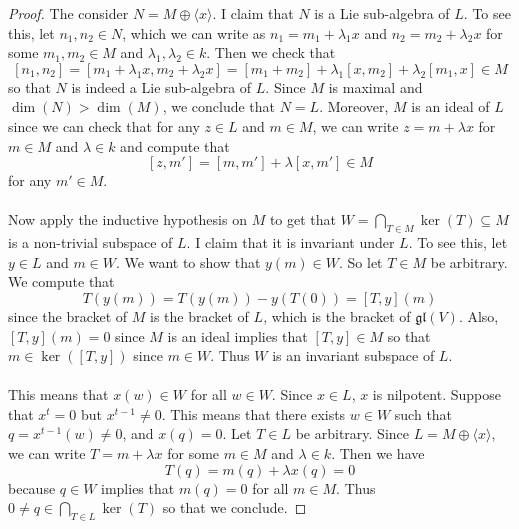 \documentclass[a4paper]{article}
\begin{document}
\begin{prp}{}{}
\begin{proof}
The consider $N=M\oplus\langle x\rangle$. I claim that $N$ is a Lie sub-algebra of $L$. To see this, let $n_1,n_2\in N$, which we can write as $n_1=m_1+\lambda_1x$ and $n_2=m_2+\lambda_2x$ for some $m_1,m_2\in M$ and $\lambda_1,\lambda_2\in k$. Then we check that $$[n_1,n_2]=[m_1+\lambda_1x,m_2+\lambda_2x]=[m_1+m_2]+\lambda_1[x,m_2]+\lambda_2[m_1,x]\in M$$ so that $N$ is indeed a Lie sub-algebra of $L$. Since $M$ is maximal and $\dim(N)>\dim(M)$, we conclude that $N=L$. Moreover, $M$ is an ideal of $L$ since we can check that for any $z\in L$ and $m\in M$, we can write $z=m+\lambda x$ for $m\in M$ and $\lambda\in k$ and compute that $$[z,m']=[m,m']+\lambda[x,m']\in M$$ for any $m'\in M$. \\~\\

Now apply the inductive hypothesis on $M$ to get that $W=\bigcap_{T\in M}\ker(T)\subseteq M$ is a non-trivial subspace of $L$. I claim that it is invariant under $L$. To see this, let $y\in L$ and $m\in W$. We want to show that $y(m)\in W$. So let $T\in M$ be arbitrary. We compute that $$T(y(m))=T(y(m))-y(T(0))=[T,y](m)$$ since the bracket of $M$ is the bracket of $L$, which is the bracket of $\mathfrak{gl}(V)$. Also, $[T,y](m)=0$ since $M$ is an ideal implies that $[T,y]\in M$ so that $m\in\ker([T,y])$ since $m\in W$. Thus $W$ is an invariant subspace of $L$. \\~\\

This means that $x(w)\in W$ for all $w\in W$. Since $x\in L$, $x$ is nilpotent. Suppose that $x^t=0$ but $x^{t-1}\neq 0$. This means that there exists $w\in W$ such that $q=x^{t-1}(w)\neq 0$, and $x(q)=0$. Let $T\in L$ be arbitrary. Since $L=M\oplus\langle x\rangle$, we can write $T=m+\lambda x$ for some $m\in M$ and $\lambda\in k$. Then we have $$T(q)=m(q)+\lambda x(q)=0$$ because $q\in W$ implies that $m(q)=0$ for all $m\in M$. Thus $0\neq q\in\bigcap_{T\in L}\ker(T)$ so that we conclude. 
\end{proof}
\end{prp}
\end{document}
